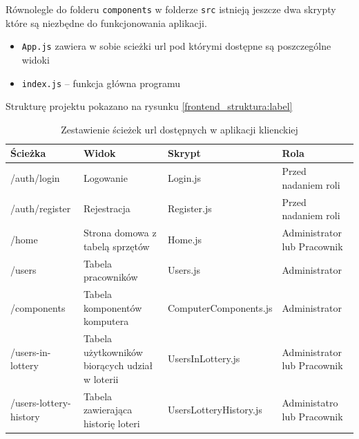 Równolegle do folderu \texttt{components} w folderze \texttt{src} istnieją jeszcze dwa skrypty które są niezbędne do funkcjonowania aplikacji.
\begin{itemize}
	\item \texttt{App.js} zawiera w sobie scieżki url pod którymi dostępne są poszczególne widoki
	\item \texttt{index.js} -- funkcja główna programu
\end{itemize}

Strukturę projektu pokazano na rysunku \ref{frontend_struktura:label}


\begin{table}[htb] \small
	\centering
\caption{Zestawienie ścieżek url dostępnych w aplikacji klienckiej}
\label{tab:zestawienie_widokow}
\begin{tabularx}{\linewidth}{|X|X|X|X|}
    \hline
    Ścieżka & Widok & Skrypt & Rola\\
    \hline \hline
    /auth/login & Logowanie &  Login.js & Przed nadaniem roli\\
    \hline
    /auth/register & Rejestracja & Register.js & Przed nadaniem roli\\
    \hline
    /home & Strona domowa z tabelą sprzętów & Home.js & Administrator lub Pracownik\\
    \hline
    /users & Tabela pracowników & Users.js & Administrator\\
    \hline
		/components & Tabela komponentów komputera& ComputerComponents.js & Administrator\\
    \hline
		/users-in-lottery & Tabela użytkowników biorących udział w loterii& UsersInLottery.js & Administrator lub Pracownik\\
    \hline
		/users-lottery-history & Tabela zawierająca historię loteri & UsersLotteryHistory.js & Administatro lub Pracownik\\

    \hline
\end{tabularx}
\end{table}


